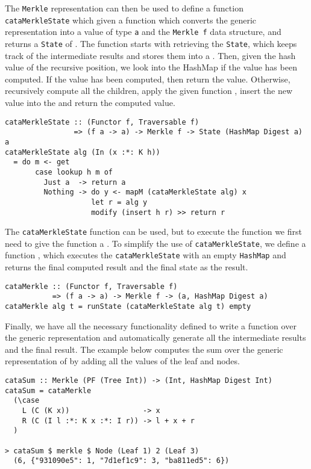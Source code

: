 The \texttt{Merkle} representation can then be used to define a function \texttt{cataMerkleState} which given a function  which converts the generic representation  into a value of type \texttt{a} and the \texttt{Merkle f} data structure, and returns a \texttt{State} of . The  function starts with retrieving the \texttt{State}, which keeps track of the intermediate results and stores them into a . Then, given the hash value of the recursive position, we look into the HashMap if the value has been computed. If the value has been computed, then return the value. Otherwise, recursively compute all the children, apply the given function , insert the new value into the  and return the computed value.

\begin{verbatim}
cataMerkleState :: (Functor f, Traversable f)
                => (f a -> a) -> Merkle f -> State (HashMap Digest a) a
cataMerkleState alg (In (x :*: K h)) 
  = do m <- get
       case lookup h m of
         Just a  -> return a
         Nothing -> do y <- mapM (cataMerkleState alg) x
                    let r = alg y
                    modify (insert h r) >> return r
\end{verbatim}

The \texttt{cataMerkleState} function can be used, but to execute the function we first need to give the function a . To simplify the use of \texttt{cataMerkleState}, we define a function , which executes the \texttt{cataMerkleState} with an empty \texttt{HashMap} and returns the final computed result and the final state as the result. 

\begin{verbatim}
cataMerkle :: (Functor f, Traversable f)
           => (f a -> a) -> Merkle f -> (a, HashMap Digest a)
cataMerkle alg t = runState (cataMerkleState alg t) empty
\end{verbatim}

Finally, we have all the necessary functionality defined to write a function over the generic representation and automatically generate all the intermediate results and the final result. The example below computes the sum over the generic representation of  by adding all the values of the leaf and nodes. 

\begin{verbatim}
cataSum :: Merkle (PF (Tree Int)) -> (Int, HashMap Digest Int)
cataSum = cataMerkle
  (\case
    L (C (K x))                 -> x
    R (C (I l :*: K x :*: I r)) -> l + x + r
  )

> cataSum $ merkle $ Node (Leaf 1) 2 (Leaf 3)
  (6, {"931090e5": 1, "7d1ef1c9": 3, "ba811ed5": 6})
\end{verbatim}


